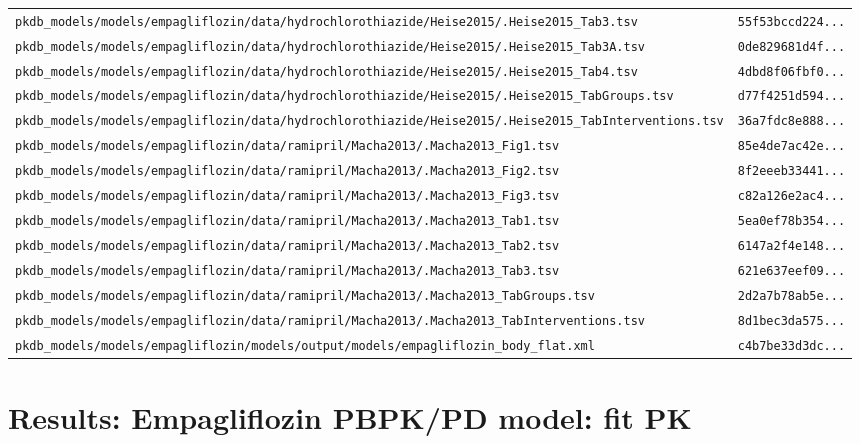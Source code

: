 \documentclass{article}
\begin{document}
\begin{longtable}{ll}
\texttt{pkdb\_models/models/empagliflozin/data/hydrochlorothiazide/Heise2015/.Heise2015\_Tab3.tsv} & \texttt{55f53bccd224...} \\
\texttt{pkdb\_models/models/empagliflozin/data/hydrochlorothiazide/Heise2015/.Heise2015\_Tab3A.tsv} & \texttt{0de829681d4f...} \\
\texttt{pkdb\_models/models/empagliflozin/data/hydrochlorothiazide/Heise2015/.Heise2015\_Tab4.tsv} & \texttt{4dbd8f06fbf0...} \\
\texttt{pkdb\_models/models/empagliflozin/data/hydrochlorothiazide/Heise2015/.Heise2015\_TabGroups.tsv} & \texttt{d77f4251d594...} \\
\texttt{pkdb\_models/models/empagliflozin/data/hydrochlorothiazide/Heise2015/.Heise2015\_TabInterventions.tsv} & \texttt{36a7fdc8e888...} \\
\texttt{pkdb\_models/models/empagliflozin/data/ramipril/Macha2013/.Macha2013\_Fig1.tsv} & \texttt{85e4de7ac42e...} \\
\texttt{pkdb\_models/models/empagliflozin/data/ramipril/Macha2013/.Macha2013\_Fig2.tsv} & \texttt{8f2eeeb33441...} \\
\texttt{pkdb\_models/models/empagliflozin/data/ramipril/Macha2013/.Macha2013\_Fig3.tsv} & \texttt{c82a126e2ac4...} \\
\texttt{pkdb\_models/models/empagliflozin/data/ramipril/Macha2013/.Macha2013\_Tab1.tsv} & \texttt{5ea0ef78b354...} \\
\texttt{pkdb\_models/models/empagliflozin/data/ramipril/Macha2013/.Macha2013\_Tab2.tsv} & \texttt{6147a2f4e148...} \\
\texttt{pkdb\_models/models/empagliflozin/data/ramipril/Macha2013/.Macha2013\_Tab3.tsv} & \texttt{621e637eef09...} \\
\texttt{pkdb\_models/models/empagliflozin/data/ramipril/Macha2013/.Macha2013\_TabGroups.tsv} & \texttt{2d2a7b78ab5e...} \\
\texttt{pkdb\_models/models/empagliflozin/data/ramipril/Macha2013/.Macha2013\_TabInterventions.tsv} & \texttt{8d1bec3da575...} \\
\texttt{pkdb\_models/models/empagliflozin/models/output/models/empagliflozin\_body\_flat.xml} & \texttt{c4b7be33d3dc...} \\
\end{longtable}

\section{Results: Empagliflozin PBPK/PD model: fit PK}
\end{document}
